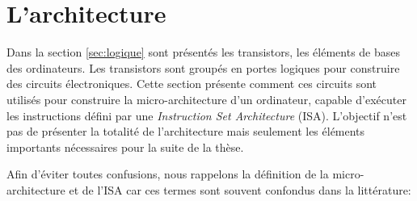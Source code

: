 \section{L'architecture} \label{sec:micro}

Dans la section \autoref{sec:logique} sont présentés les transistors, les éléments de bases des ordinateurs. Les transistors sont groupés en portes logiques pour construire des circuits électroniques. Cette section présente comment ces circuits sont utilisés pour construire la micro-architecture d'un ordinateur, capable d'exécuter les instructions défini par une \textit{Instruction Set Architecture} (ISA). L'objectif n'est pas de présenter la totalité de l'architecture mais seulement les éléments importants nécessaires pour la suite de la thèse.


Afin d'éviter toutes confusions, nous rappelons la définition de la micro-architecture et de l'ISA car ces termes sont souvent confondus dans la littérature:

